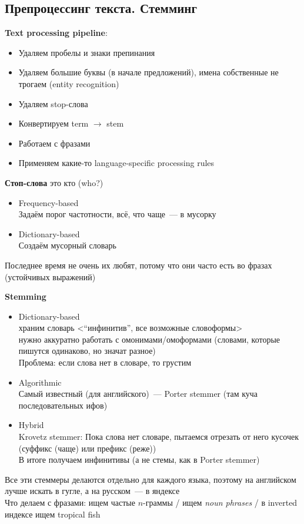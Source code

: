 \documentclass[12pt]{article}
\begin{document}
  \subsection{Препроцессинг текста. Стемминг}
    {\bf Text processing pipeline}:
      \begin{itemize}
          \item Удаляем пробелы и знаки препинания
          \item Удаляем большие буквы (в начале предложений), имена собственные не трогаем (entity recognition)
          \item Удаляем stop-слова
          \item Конвертируем term $\to$ stem
          \item Работаем с фразами
          \item Применяем какие-то language-specific processing rules
      \end{itemize}

      \smallskip\smallskip
      {\bf Стоп-слова} это кто (who?)
        \begin{itemize}
          \item Frequency-based\\
           Задаём порог частотности, всё, что чаще~--- в мусорку
          \item Dictionary-based\\
          Создаём мусорный словарь
        \end{itemize}
      Последнее время не очень их любят, потому что они часто есть во фразах (устойчивых выражений)

      \smallskip\smallskip
      {\bf Stemming}
        \begin{itemize}
            \item Dictionary-based\\
              храним словарь <``инфинитив'', все возможные словоформы>\\
              нужно аккуратно работать с омонимами/омоформами (словами, которые пишутся одинаково, но значат разное)\\
              Проблема: если слова нет в словаре, то грустим
            \item Algorithmic\\
              Самый известный (для английского)~--- Porter stemmer (там куча последовательных ифов)
            \item Hybrid\\
              Krovetz stemmer: Пока слова нет словаре, пытаемся отрезать от него кусочек (суффикс (чаще) или префикс (реже))\\
              В итоге получаем инфинитивы (а не стемы, как в Porter stemmer)
        \end{itemize}
      Все эти стеммеры делаются отдельно для каждого языка, поэтому на английском лучше искать в гугле, а на русском~--- в яндексе\\
      Что делаем с фразами: ищем частые $n$-граммы / ищем \textit{noun phrases} / в inverted индексе ищем tropical fish
      \pagebreak
\end{document}
